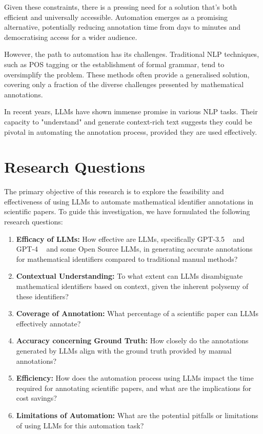 Given these constraints, there is a pressing need for a solution that's both efficient and universally accessible. Automation emerges as a promising alternative, potentially reducing annotation time from days to minutes and democratising access for a wider audience.

However, the path to automation has its challenges. Traditional \ac{NLP} techniques, such as \ac{POS} tagging or the establishment of formal grammar, tend to oversimplify the problem. These methods often provide a generalised solution, covering only a fraction of the diverse challenges presented by mathematical annotations. 

In recent years, LLMs have shown immense promise in various NLP tasks. Their capacity to "understand" and generate context-rich text suggests they could be pivotal in automating the annotation process, provided they are used effectively.

\section{Research Questions}

The primary objective of this research is to explore the feasibility and effectiveness of using LLMs to automate mathematical identifier annotations in scientific papers. To guide this investigation, we have formulated the following research questions:

\begin{enumerate}
    \item \textbf{Efficacy of LLMs:} How effective are LLMs, specifically GPT-3.5 ~\citep{openai2023} and GPT-4 ~\citep{2303.08774} and some Open Source LLMs, in generating accurate annotations for mathematical identifiers compared to traditional manual methods?
    
    \item \textbf{Contextual Understanding:} To what extent can LLMs disambiguate mathematical identifiers based on context, given the inherent polysemy of these identifiers?
    
    \item \textbf{Coverage of Annotation:} What percentage of a scientific paper can LLMs effectively annotate?
    
    \item \textbf{Accuracy concerning Ground Truth:} How closely do the annotations generated by LLMs align with the ground truth provided by manual annotations?
    
    \item \textbf{Efficiency:} How does the automation process using LLMs impact the time required for annotating scientific papers, and what are the implications for cost savings?
    
    \item \textbf{Limitations of Automation:} What are the potential pitfalls or limitations of using LLMs for this automation task?
\end{enumerate}

